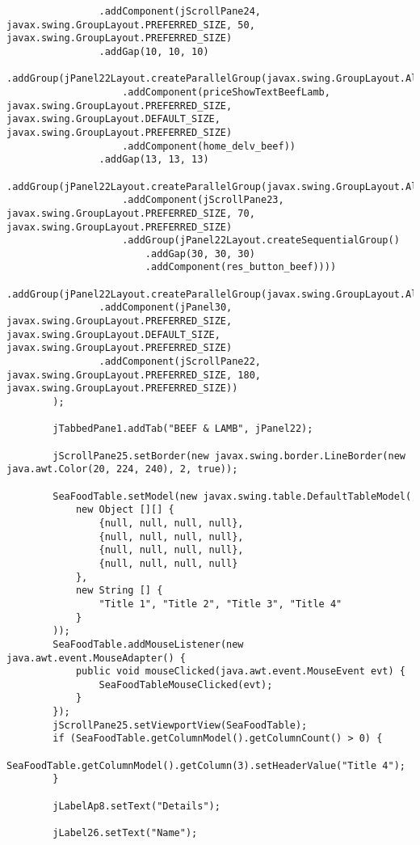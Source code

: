 \documentclass[12pt,a4paper]{article}
\begin{document}
\begin{lstlisting}
                .addComponent(jScrollPane24, javax.swing.GroupLayout.PREFERRED_SIZE, 50, javax.swing.GroupLayout.PREFERRED_SIZE)
                .addGap(10, 10, 10)
                .addGroup(jPanel22Layout.createParallelGroup(javax.swing.GroupLayout.Alignment.LEADING)
                    .addComponent(priceShowTextBeefLamb, javax.swing.GroupLayout.PREFERRED_SIZE, javax.swing.GroupLayout.DEFAULT_SIZE, javax.swing.GroupLayout.PREFERRED_SIZE)
                    .addComponent(home_delv_beef))
                .addGap(13, 13, 13)
                .addGroup(jPanel22Layout.createParallelGroup(javax.swing.GroupLayout.Alignment.LEADING)
                    .addComponent(jScrollPane23, javax.swing.GroupLayout.PREFERRED_SIZE, 70, javax.swing.GroupLayout.PREFERRED_SIZE)
                    .addGroup(jPanel22Layout.createSequentialGroup()
                        .addGap(30, 30, 30)
                        .addComponent(res_button_beef))))
            .addGroup(jPanel22Layout.createParallelGroup(javax.swing.GroupLayout.Alignment.TRAILING)
                .addComponent(jPanel30, javax.swing.GroupLayout.PREFERRED_SIZE, javax.swing.GroupLayout.DEFAULT_SIZE, javax.swing.GroupLayout.PREFERRED_SIZE)
                .addComponent(jScrollPane22, javax.swing.GroupLayout.PREFERRED_SIZE, 180, javax.swing.GroupLayout.PREFERRED_SIZE))
        );

        jTabbedPane1.addTab("BEEF & LAMB", jPanel22);

        jScrollPane25.setBorder(new javax.swing.border.LineBorder(new java.awt.Color(20, 224, 240), 2, true));

        SeaFoodTable.setModel(new javax.swing.table.DefaultTableModel(
            new Object [][] {
                {null, null, null, null},
                {null, null, null, null},
                {null, null, null, null},
                {null, null, null, null}
            },
            new String [] {
                "Title 1", "Title 2", "Title 3", "Title 4"
            }
        ));
        SeaFoodTable.addMouseListener(new java.awt.event.MouseAdapter() {
            public void mouseClicked(java.awt.event.MouseEvent evt) {
                SeaFoodTableMouseClicked(evt);
            }
        });
        jScrollPane25.setViewportView(SeaFoodTable);
        if (SeaFoodTable.getColumnModel().getColumnCount() > 0) {
            SeaFoodTable.getColumnModel().getColumn(3).setHeaderValue("Title 4");
        }

        jLabelAp8.setText("Details");

        jLabel26.setText("Name");


\end{lstlisting}
\end{document}
